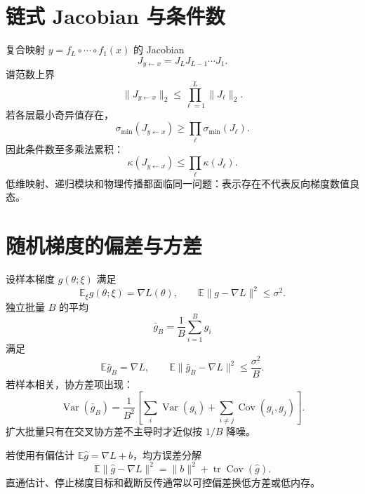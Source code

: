 \documentclass[11pt]{article}
\numberwithin{equation}{section}
\newcommand{\E}{\mathbb{E}}
\newcommand{\1}{\mathbf{1}}
\newcommand{\tr}{\operatorname{tr}}
\newcommand{\Var}{\operatorname{Var}}
\newcommand{\Cov}{\operatorname{Cov}}
\begin{document}
\section{链式 Jacobian 与条件数}

复合映射 $y=f_L\circ\cdots\circ f_1(x)$ 的 Jacobian
\begin{equation}
 J_{y\leftarrow x}=J_LJ_{L-1}\cdots J_1.
\end{equation}
谱范数上界
\begin{equation}
 \|J_{y\leftarrow x}\|_2\le\prod_{\ell=1}^{L}\|J_\ell\|_2.
\end{equation}
若各层最小奇异值存在，
\begin{equation}
 \sigma_{\min}(J_{y\leftarrow x})
 \ge\prod_\ell\sigma_{\min}(J_\ell).
\end{equation}
因此条件数至多乘法累积：
\begin{equation}
 \kappa(J_{y\leftarrow x})
 \le\prod_\ell\kappa(J_\ell).
\end{equation}
低维映射、递归模块和物理传播都面临同一问题：表示存在不代表反向梯度数值良态。

\section{随机梯度的偏差与方差}

设样本梯度 $g(\theta;\xi)$ 满足
\begin{equation}
 \E_\xi g(\theta;\xi)=\nabla L(\theta),
 \qquad \E\|g-\nabla L\|^2\le\sigma^2.
\end{equation}
独立批量 $B$ 的平均
\begin{equation}
 \bar g_B=\frac1B\sum_{i=1}^{B}g_i
\end{equation}
满足
\begin{equation}
 \E\bar g_B=\nabla L,\qquad
 \E\|\bar g_B-\nabla L\|^2\le\frac{\sigma^2}{B}.
\end{equation}
若样本相关，协方差项出现：
\begin{equation}
 \Var(\bar g_B)=\frac1{B^2}\left[
 \sum_i\Var(g_i)+\sum_{i\ne j}\Cov(g_i,g_j)
 \right].
\end{equation}
扩大批量只有在交叉协方差不主导时才近似按 $1/B$ 降噪。

若使用有偏估计 $\E\widehat g=\nabla L+b$，均方误差分解
\begin{equation}
 \E\|\widehat g-\nabla L\|^2
 =\|b\|^2+\tr\Cov(\widehat g).
\end{equation}
直通估计、停止梯度目标和截断反传通常以可控偏差换低方差或低内存。
\end{document}

